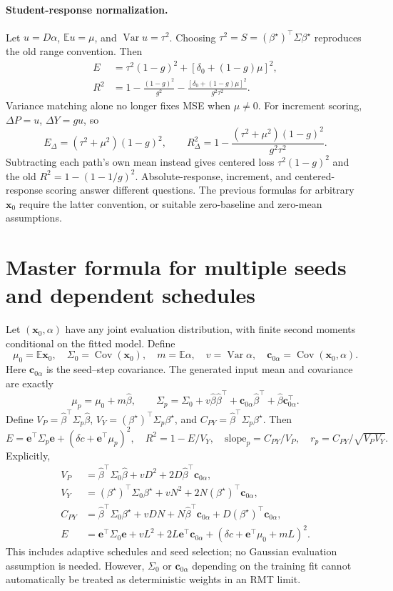 \documentclass[11pt]{article}
\newcommand{\E}{\mathbb E}
\newcommand{\Var}{\operatorname{Var}}
\newcommand{\Cov}{\operatorname{Cov}}
\newcommand{\bstar}{{\beta^{\star}}}
\newcommand{\bhat}{\hat{\beta}}
\newcommand{\x}{\mathbf{x}}
\begin{document}
\paragraph{Student-response normalization.}
Let $u=D\alpha$, $\E u=\mu$, and $\Var u=\tau^2$.
Choosing $\tau^2=S=(\bstar)^\top\Sigma\bstar$ reproduces the old range convention.
Then
\begin{align}
 E&=\tau^2(1-g)^2+[\delta_0+(1-g)\mu]^2,\label{eq:single-normalized}\\
 R^2&=1-\frac{(1-g)^2}{g^2}
       -\frac{[\delta_0+(1-g)\mu]^2}{g^2\tau^2}.
\end{align}
Variance matching alone no longer fixes MSE when $\mu\ne0$.
For increment scoring, $\Delta P=u$, $\Delta Y=g u$, so
\[
 E_\Delta=(\tau^2+\mu^2)(1-g)^2,\qquad
 R^2_\Delta=1-\frac{(\tau^2+\mu^2)(1-g)^2}{g^2\tau^2}.
\]
Subtracting each path's own mean instead gives centered loss
$\tau^2(1-g)^2$ and the old $R^2=1-(1-1/g)^2$.
Absolute-response, increment, and centered-response scoring answer different
questions. The previous formulas for arbitrary $\x_0$ require the latter
convention, or suitable zero-baseline and zero-mean assumptions.

\section{Master formula for multiple seeds and dependent schedules}
Let $(\x_0,\alpha)$ have any joint evaluation distribution, with finite
second moments conditional on the fitted model. Define
\[
 \mu_0=\E\x_0,\quad \Sigma_0=\Cov(\x_0),\quad
 m=\E\alpha,\quad v=\Var\alpha,\quad
 \bm c_{0\alpha}=\Cov(\x_0,\alpha).
\]
Here $\bm c_{0\alpha}$ is the seed--step covariance. The generated input mean and covariance are exactly
\begin{equation}
 \mu_p=\mu_0+m\bhat,\qquad
 \Sigma_p=\Sigma_0+v\bhat\bhat^\top+\bm c_{0\alpha}\bhat^\top+\bhat\bm c_{0\alpha}^\top.
 \label{eq:input-covariance}
\end{equation}
Define $V_P=\bhat^\top \Sigma_p\bhat$, $V_Y=(\bstar)^\top \Sigma_p\bstar$, and
$C_{PY}=\bhat^\top \Sigma_p\bstar$. Then
\begin{equation}\boxed{
 E=\bm e^\top \Sigma_p\bm e+(\delta c+\bm e^\top\mu_p)^2,\quad
 R^2=1-E/V_Y,\quad \mathrm{slope}_p=C_{PY}/V_P,\quad
 r_p=C_{PY}/\sqrt{V_PV_Y}.}
 \label{eq:master}
\end{equation}
Explicitly,
\begin{align}
 V_P&=\bhat^\top \Sigma_0\bhat+vD^2+2D\bhat^\top\bm c_{0\alpha},\\
 V_Y&=(\bstar)^\top \Sigma_0\bstar+vN^2+2N(\bstar)^\top\bm c_{0\alpha},\\
 C_{PY}&=\bhat^\top \Sigma_0\bstar+vDN+N\bhat^\top\bm c_{0\alpha}+D(\bstar)^\top\bm c_{0\alpha},\\
 E&=\bm e^\top \Sigma_0\bm e+vL^2+2L\bm e^\top\bm c_{0\alpha}
       +(\delta c+\bm e^\top\mu_0+mL)^2.
\end{align}
This includes adaptive schedules and seed selection; no Gaussian evaluation
assumption is needed. However, $\Sigma_0$ or $\bm c_{0\alpha}$ depending on the training fit
cannot automatically be treated as deterministic weights in an RMT limit.
\end{document}

